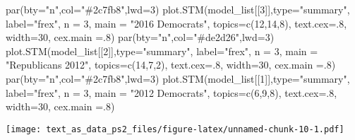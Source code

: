 \documentclass[
]{article}
\newenvironment{Shaded}{\begin{snugshade}}{\end{snugshade}}
\newcommand{\AttributeTok}[1]{\textcolor[rgb]{0.77,0.63,0.00}{#1}}
\newcommand{\DecValTok}[1]{\textcolor[rgb]{0.00,0.00,0.81}{#1}}
\newcommand{\FunctionTok}[1]{\textcolor[rgb]{0.00,0.00,0.00}{#1}}
\newcommand{\NormalTok}[1]{#1}
\newcommand{\StringTok}[1]{\textcolor[rgb]{0.31,0.60,0.02}{#1}}
\begin{document}
\begin{Shaded}
\begin{Highlighting}[]
\FunctionTok{par}\NormalTok{(}\AttributeTok{bty=}\StringTok{"n"}\NormalTok{,}\AttributeTok{col=}\StringTok{"\#2c7fb8"}\NormalTok{,}\AttributeTok{lwd=}\DecValTok{3}\NormalTok{)}
\FunctionTok{plot.STM}\NormalTok{(model\_list[[}\DecValTok{3}\NormalTok{]],}\AttributeTok{type=}\StringTok{"summary"}\NormalTok{, }\AttributeTok{label=}\StringTok{"frex"}\NormalTok{, }\AttributeTok{n =} \DecValTok{3}\NormalTok{, }\AttributeTok{main =} \StringTok{"2016 Democrats"}\NormalTok{, }
     \AttributeTok{topics=}\FunctionTok{c}\NormalTok{(}\DecValTok{12}\NormalTok{,}\DecValTok{14}\NormalTok{,}\DecValTok{8}\NormalTok{), }\AttributeTok{text.cex=}\NormalTok{.}\DecValTok{8}\NormalTok{, }\AttributeTok{width=}\DecValTok{30}\NormalTok{, }\AttributeTok{cex.main =}\NormalTok{.}\DecValTok{8}\NormalTok{)}
\FunctionTok{par}\NormalTok{(}\AttributeTok{bty=}\StringTok{"n"}\NormalTok{,}\AttributeTok{col=}\StringTok{"\#de2d26"}\NormalTok{,}\AttributeTok{lwd=}\DecValTok{3}\NormalTok{)}
\FunctionTok{plot.STM}\NormalTok{(model\_list[[}\DecValTok{2}\NormalTok{]],}\AttributeTok{type=}\StringTok{"summary"}\NormalTok{, }\AttributeTok{label=}\StringTok{"frex"}\NormalTok{, }\AttributeTok{n =} \DecValTok{3}\NormalTok{, }\AttributeTok{main =} \StringTok{"Republicans 2012"}\NormalTok{, }
    \AttributeTok{topics=}\FunctionTok{c}\NormalTok{(}\DecValTok{14}\NormalTok{,}\DecValTok{7}\NormalTok{,}\DecValTok{2}\NormalTok{), }\AttributeTok{text.cex=}\NormalTok{.}\DecValTok{8}\NormalTok{, }\AttributeTok{width=}\DecValTok{30}\NormalTok{, }\AttributeTok{cex.main =}\NormalTok{.}\DecValTok{8}\NormalTok{)}
\FunctionTok{par}\NormalTok{(}\AttributeTok{bty=}\StringTok{"n"}\NormalTok{,}\AttributeTok{col=}\StringTok{"\#2c7fb8"}\NormalTok{,}\AttributeTok{lwd=}\DecValTok{3}\NormalTok{)}
\FunctionTok{plot.STM}\NormalTok{(model\_list[[}\DecValTok{1}\NormalTok{]],}\AttributeTok{type=}\StringTok{"summary"}\NormalTok{, }\AttributeTok{label=}\StringTok{"frex"}\NormalTok{, }\AttributeTok{n =} \DecValTok{3}\NormalTok{, }\AttributeTok{main =} \StringTok{"2012 Democrats"}\NormalTok{, }
     \AttributeTok{topics=}\FunctionTok{c}\NormalTok{(}\DecValTok{6}\NormalTok{,}\DecValTok{9}\NormalTok{,}\DecValTok{8}\NormalTok{), }\AttributeTok{text.cex=}\NormalTok{.}\DecValTok{8}\NormalTok{, }\AttributeTok{width=}\DecValTok{30}\NormalTok{, }\AttributeTok{cex.main =}\NormalTok{.}\DecValTok{8}\NormalTok{)}
\end{Highlighting}
\end{Shaded}

\texttt{[image: text\_as\_data\_ps2\_files/figure-latex/unnamed-chunk-10-1.pdf]}
\end{document}
